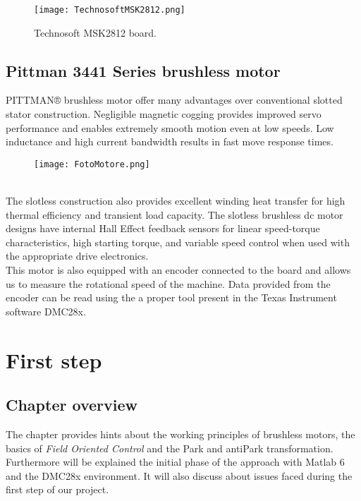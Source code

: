 \documentclass[12pt]{article}
\begin{document}
\begin{figure}[h]
\centering
\texttt{[image: TechnosoftMSK2812.png]}
\caption{\label{fig:setup}Technosoft MSK2812 board.}
\end{figure}

\newpage\subsection{Pittman 3441 Series brushless motor}

PITTMAN® brushless motor offer many advantages over conventional slotted stator construction. Negligible magnetic cogging provides improved servo performance and enables extremely smooth motion even at low speeds. Low inductance and high current bandwidth results in fast move response times. \\
\begin{figure}[h]
\centering
\texttt{[image: FotoMotore.png]}
\end{figure}\\[0.4cm]
The slotless construction also provides excellent winding heat transfer for high thermal efficiency and transient load capacity. The slotless brushless dc motor designs have internal Hall Effect feedback sensors for linear speed-torque characteristics, high starting torque, and variable speed control when used with the appropriate drive electronics.\\
This motor is also equipped with an encoder connected to the board and allows us to measure the rotational speed of the machine.
Data provided from the encoder can be read using the a proper tool present in the Texas Instrument software DMC28x.\\

\section{First step}
\subsection{Chapter overview}
The chapter provides hints about the working principles of brushless motors, the basics of \textit{Field Oriented Control} and the Park and antiPark transformation.
Furthermore will be explained the initial phase of the approach with Matlab 6 and the DMC28x environment.
It will also discuss about issues faced during the first step of our project.
\end{document}
